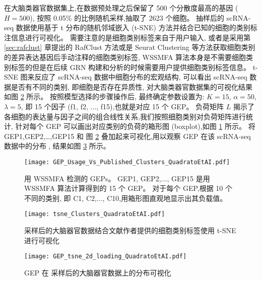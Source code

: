 在大脑类器官数据集上,在数据预处理之后保留了 500 个分散度最高的基因 ($H = 500$),
按照 0.05\% 的比例随机采样,抽取了 2623 个细胞。
抽样后的 scRNA-seq 数据使用基于 t 分布的随机邻域嵌入 (t-SNE) 方法并结合已知的细胞的类别标注信息进行可视化。
需要注意的是细胞类别标签来自于用户输入,
或者是采用第 \ref{sec:rafclust} 章提出的 RafClust 方法或是 Seurat Clustering 等方法获取细胞类别的差异表达基因后手动注释的细胞类别标签, 
WSSMFA 算法本身是不需要细胞类别标签的但是在后续 GRN 构建和分析的时候需要用户提供细胞类别标签信息。
t-SNE 图来反应了 scRNA-seq 数据中细胞分布的宏观结构,
可以看出 scRNA-seq 数据是否有不同的类别,
即细胞是否存在异质性,
对大脑类器官数据集的可视化结果如图 \ref{fig:gep-tsne} 所示。
按照模型选择的步骤操作后,
最终确定参数设置为: $K = 15$, $\alpha = 50$, $\lambda = 5$, 
即 15 个因子 (f1, f2, $\ldots$, f15),也就是对应 15 个 GEP。
负荷矩阵 $L$ 揭示了各细胞的表达量与因子之间的组合线性关系,我们按照细胞类别对负荷矩阵进行统计,
针对每个 GEP 可以画出对应类别的负荷的箱形图 (boxplot),如图 \ref{fig:gep-gep} 所示。
将 GEP1,GEP2,\ldots,GEP15 和 图 \ref{fig:gep-tsne} 叠加起来可视化,用以观察 GEP 在该 scRNA-seq 数据中的分布,
结果如图 \ref{fig:gep-distribution} 所示。

\begin{figure}[!htbp]
    \centering
    \texttt{[image: GEP\_Usage\_Vs\_Published\_Clusters\_QuadratoEtAI.pdf]}
    \caption{
    用 WSSMFA 检测的 GEPs。
    GEP1, GEP2,$\ldots$, GEP15 是用 WSSMFA 算法计算得到的 15 个 GEP。
    对于每个 GEP,根据 10 个不同的类别,
    即 C1, C2,$\ldots$, C10,用箱形图直观地显示出其负载值。 
    }
    \label{fig:gep-gep}
\end{figure}

\begin{figure}[!htbp]
    \centering
    \texttt{[image: tsne\_Clusters\_QuadratoEtAI.pdf]}
    \caption{
    采样后的大脑器官数据结合文献作者提供的细胞类别标签使用 t-SNE 进行可视化
    }
    \label{fig:gep-tsne}
\end{figure}

\begin{figure}[!htbp]
    \centering
    \texttt{[image: GEP\_tsne\_2d\_loading\_QuadratoEtAI.pdf]}
    \caption{
    GEP 在 采样后的大脑器官数据上的分布可视化
    }
    \label{fig:gep-distribution}
\end{figure}

